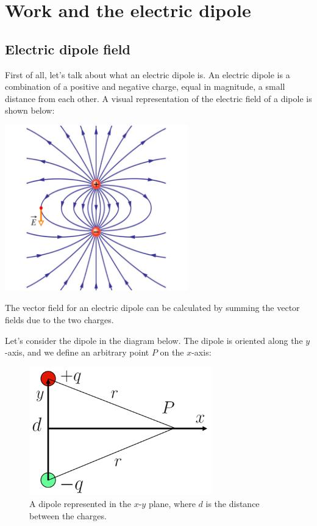 \documentclass[
  letterpaper,
  DIV=11,
  numbers=noendperiod]{scrreprt}
\begin{document}
\section{Work and the electric
dipole}\label{work-and-the-electric-dipole}

\subsection{Electric dipole field}\label{electric-dipole-field}

First of all, let's talk about what an electric dipole is. An electric
dipole is a combination of a positive and negative charge, equal in
magnitude, a small distance from each other. A visual representation of
the electric field of a dipole is shown below:

\includegraphics[width=3.125in,height=\textheight]{Figures/dipole_field.png}

The vector field for an electric dipole can be calculated by summing the
vector fields due to the two charges.

Let's consider the dipole in the diagram below. The dipole is oriented
along the \(y\)-axis, and we define an arbitrary point \(P\) on the
\(x\)-axis:

\begin{figure}[H]

{\centering \includegraphics[width=3.125in,height=\textheight]{Figures/dipole_diagram.png}

}

\caption{A dipole represented in the \(x\)-\(y\) plane, where \(d\) is
the distance between the charges.}

\end{figure}%
\end{document}
